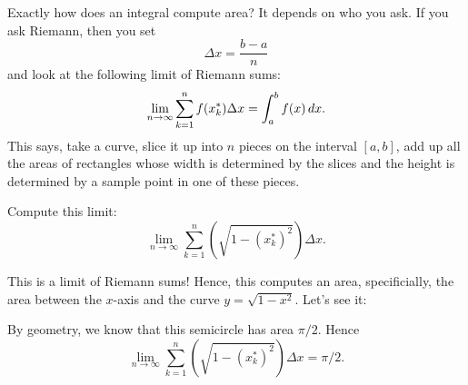\documentclass{ximera}
\begin{document}
Exactly how does an integral compute area? It depends on who you
ask. If you ask Riemann, then you set
\[
\Delta x = \frac{b-a}{n}
\]
and look at the following limit of Riemann sums:
\[
\lim_{n\to \infty} \sum_{k=1}^n f(x_k^*) \Delta x = \int_a^b f(x) \,d x.
\]
This says, take a curve, slice it up into $n$ pieces on the interval
$[a,b]$, add up all the areas of rectangles whose width is determined
by the slices and the height is determined by a sample point in one of
these pieces.

\begin{example}
  Compute this limit:
  \[
  \lim_{n\to \infty} \sum_{k=1}^n \left(\sqrt{1-(x_k^*)^2}\right)
  \Delta x.
  \]
  \begin{explanation}
    This is a limit of Riemann sums! Hence, this computes an area,
    specificially, the area between the $x$-axis and the curve $y =
    \sqrt{1-x^2}$. Let's see it:
    \begin{image}
    \end{image}
    By geometry, we know that this semicircle has area $\pi/2$. Hence
    \[
    \lim_{n\to \infty} \sum_{k=1}^n \left(\sqrt{1-(x_k^*)^2}\right)\Delta x = \pi/2.
    \]
  \end{explanation}
\end{example}
\end{document}
